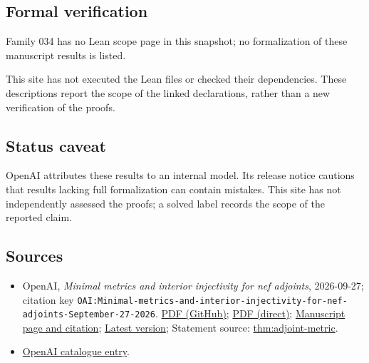 \documentclass[11pt]{article}
\begin{document}
\subsection{Formal verification}
Family 034 has no Lean scope page in this snapshot; no formalization of these manuscript results is listed.

This site has not executed the Lean files or checked their dependencies. These descriptions report the scope of the linked declarations, rather than a new verification of the proofs.

\subsection{Status caveat}
OpenAI attributes these results to an internal model. Its release notice cautions that results lacking full formalization can contain mistakes. This site has not independently assessed the proofs; a solved label records the scope of the reported claim.

\subsection{Sources}
\begin{itemize}
\item OpenAI, \emph{Minimal metrics and interior injectivity for nef adjoints}, 2026-09-27; citation key \texttt{OAI:Minimal-metrics-and-interior-injectivity-for-nef-adjoints-September-27-2026}. \href{https://github.com/openai/math/blob/adc7f1241b42e322a6451854ab7e4b4c146bf78a/preprints/Minimal-metrics-and-interior-injectivity-for-nef-adjoints-September-27-2026/paper.pdf}{PDF (GitHub)}; \href{https://github.com/openai/math/raw/adc7f1241b42e322a6451854ab7e4b4c146bf78a/preprints/Minimal-metrics-and-interior-injectivity-for-nef-adjoints-September-27-2026/paper.pdf}{PDF (direct)}; \href{https://github.com/openai/math/blob/adc7f1241b42e322a6451854ab7e4b4c146bf78a/preprints/Minimal-metrics-and-interior-injectivity-for-nef-adjoints-September-27-2026/README.md}{Manuscript page and citation}; \href{https://github.com/openai/math/blob/main/preprints/Minimal-metrics-and-interior-injectivity-for-nef-adjoints-September-27-2026/paper.pdf}{Latest version}; Statement source: \href{https://github.com/openai/math/blob/adc7f1241b42e322a6451854ab7e4b4c146bf78a/preprints/Minimal-metrics-and-interior-injectivity-for-nef-adjoints-September-27-2026/build/sections/introduction.tex\#L29}{thm:adjoint-metric}.
\item \href{https://github.com/openai/math/blob/adc7f1241b42e322a6451854ab7e4b4c146bf78a/CONTENTS.md}{OpenAI catalogue entry}.
\end{itemize}
\end{document}
